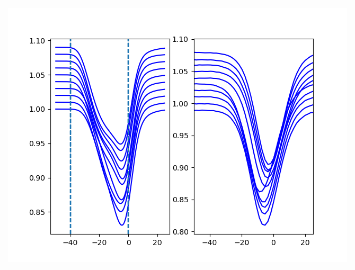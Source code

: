 \documentclass{/Users/art2/TeX/aanda/aa}
\def\kms {km\,s$^{-1}$}
\begin{document}
\begin{figure}
   \includegraphics[width=0.8\textwidth]{Fig1_Nadira1.png}
   \caption{ }
   \label{betelbeta1}
   \end{figure}
\end{document}
